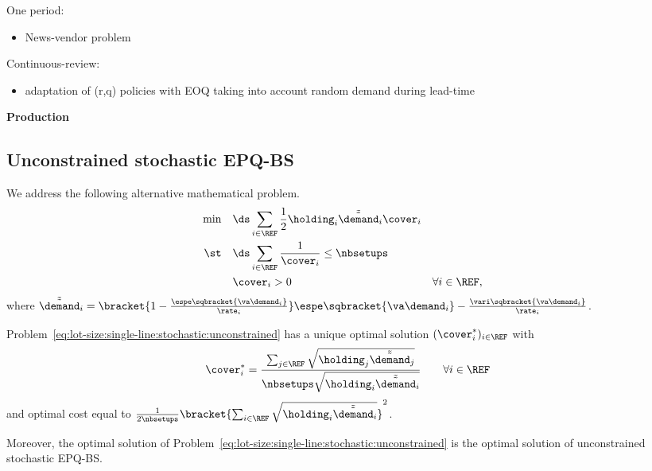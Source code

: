 One period:
\begin{itemize}
  \item News-vendor problem \cite{Edgeworth88,Arrow1951}
\end{itemize}

Continuous-review:
\begin{itemize}
  \item adaptation of (r,q) policies with EOQ taking into account random demand during lead-time \cite{Gallego1998}
\end{itemize}

\medskip

\textbf{Production}







\subsection{Unconstrained stochastic EPQ-BS}


We address the following alternative mathematical problem.
\begin{subequations}\label{eq:lot-size:single-line:stochastic:unconstrained}
  \begin{align}
  \min\quad & \ds\sum_{i\in\REF} \frac{1}{2}\holding_i\tilde{\tilde{\demand}}_i\cover_i
  \label{eq:lot-size:single-line:stochastic:unconstrained:objective}
  \\
  \st\quad  & \ds\sum_{i\in\REF} \frac{1}{\cover_i} \le \nbsetups
  \label{eq:lot-size:single-line:stochastic:unconstrained:flexibility}
  \\
            & \cover_i > 0 && \forall i\in\REF,
  \label{eq:lot-size:single-line:stochastic:unconstrained:positivity}
  \end{align}
\end{subequations}
where $\tilde{\tilde{\demand}}_i=\bracket{1-\frac{\espe\sqbracket{\va\demand_i}}{\rate_i}}\espe\sqbracket{\va\demand_i} - \frac{\vari\sqbracket{\va\demand_i}}{\rate_i}$.

\begin{thm}\label{thm:lot-size:single-line:stochastic:unconstrained:optimality}
Problem~\eqref{eq:lot-size:single-line:stochastic:unconstrained} has a unique optimal solution $(\cover_i^*)_{i\in\REF}$ with
\begin{equation}
  \cover_i^*= \frac{\sum_{j\in\REF}\sqrt{\holding_j\tilde{\tilde{\demand}}_j}}{\nbsetups\sqrt{\holding_i\tilde{\tilde{\demand}}_i}}\qquad\forall i\in\REF
\end{equation}
and optimal cost equal to $\frac{1}{2\nbsetups}\bracket{\sum_{i\in\REF}\sqrt{\holding_i\tilde{\tilde{\demand}}_i}}^2$.

Moreover, the optimal solution of Problem~\eqref{eq:lot-size:single-line:stochastic:unconstrained} is the optimal solution of unconstrained stochastic EPQ-BS.
\end{thm}


